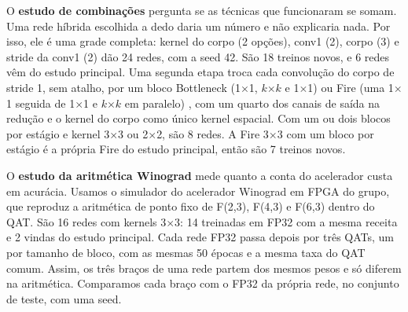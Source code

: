 \documentclass[conference]{IEEEtran}
\newcommand{\by}{\ensuremath{\times}}
\begin{document}
O \textbf{estudo de combinações} pergunta se as técnicas que funcionaram se somam. Uma rede híbrida escolhida a dedo daria um número e não explicaria nada. Por isso, ele é uma grade completa:
kernel do corpo (2 opções), conv1 (2), corpo (3) e stride da conv1 (2) dão 24 redes, com a seed 42. São 18 treinos novos, e 6 redes vêm do estudo principal.
Uma segunda etapa troca cada convolução do corpo de stride 1, sem atalho, por um bloco Bottleneck (1\by1, $k$\by$k$ e 1\by1) \cite{he2016deep}
ou Fire (uma 1\by1 seguida de 1\by1 e $k$\by$k$ em paralelo) \cite{iandola2016squeezenet}, com um quarto dos canais de saída na redução e o
kernel do corpo como único kernel espacial. Com um ou dois blocos por estágio e kernel 3\by3 ou 2\by2, são 8 redes. A Fire 3\by3 com um
bloco por estágio é a própria Fire do estudo principal, então são 7 treinos novos.

O \textbf{estudo da aritmética Winograd} mede quanto a conta do acelerador custa em acurácia. Usamos o simulador do acelerador Winograd em FPGA
do grupo, que reproduz a aritmética de ponto fixo de F(2,3), F(4,3) e F(6,3) dentro do QAT. São 16 redes com kernels 3\by3: 14 treinadas em FP32
com a mesma receita e 2 vindas do estudo principal. Cada rede FP32 passa depois por três QATs, um por tamanho de bloco, com as mesmas 50 épocas e
a mesma taxa do QAT comum. Assim, os três braços de uma rede partem dos mesmos pesos e só diferem na aritmética. Comparamos cada braço com o FP32
da própria rede, no conjunto de teste, com uma seed.
\end{document}
